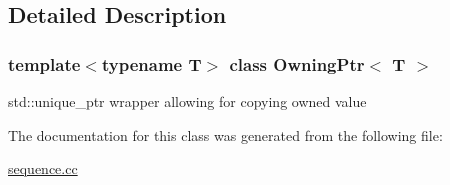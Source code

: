 \subsection{Detailed Description}
\subsubsection*{template$<$typename T$>$\newline
class Owning\+Ptr$<$ T $>$}

std\+::unique\+\_\+ptr wrapper allowing for copying owned value 

The documentation for this class was generated from the following file\+:\begin{DoxyCompactItemize}
\item 
\mbox{\hyperlink{sequence_8cc}{sequence.\+cc}}\end{DoxyCompactItemize}
